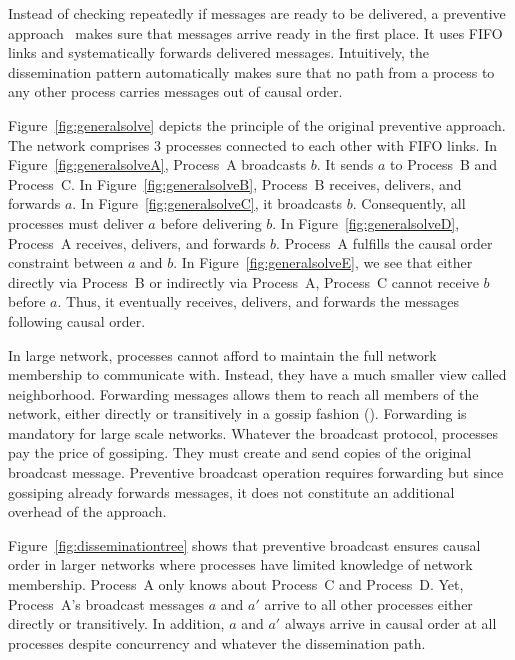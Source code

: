 Instead of checking repeatedly if messages are ready to be delivered, a
preventive approach~\cite{friedman2004causal} makes sure that messages arrive
ready in the first place.  It uses FIFO links and systematically forwards
delivered messages.  Intuitively, the dissemination pattern automatically makes
sure that no path from a process to any other process carries messages out of
causal order.

Figure~\ref{fig:generalsolve} depicts the principle of the original preventive
approach. The network comprises 3 processes connected to each other with FIFO
links.  In Figure~\ref{fig:generalsolveA}, Process~A broadcasts $b$. It sends
$a$ to Process~B and Process~C. In Figure~\ref{fig:generalsolveB}, Process~B
receives, delivers, and forwards $a$. In Figure~\ref{fig:generalsolveC}, it
broadcasts $b$. Consequently, all processes must deliver $a$ before delivering
$b$. In Figure~\ref{fig:generalsolveD}, Process~A receives, delivers, and
forwards $b$. Process~A fulfills the causal order constraint between $a$ and
$b$. In Figure~\ref{fig:generalsolveE}, we see that either directly via
Process~B or indirectly via Process~A, Process~C cannot receive $b$ before
$a$. Thus, it eventually receives, delivers, and forwards the messages following
causal order.


In large network, processes cannot afford to maintain the full network
membership to communicate with. Instead, they have a much smaller view called
neighborhood. Forwarding messages allows them to reach all members of the
network, either directly or transitively in a gossip fashion (\REF). Forwarding
is mandatory for large scale networks.  Whatever the broadcast protocol,
processes pay the price of gossiping. They must create and send copies of the
original broadcast message. Preventive broadcast operation requires forwarding
but since gossiping already forwards messages, it does not constitute an
additional overhead of the approach.

Figure~\ref{fig:disseminationtree} shows that preventive broadcast ensures
causal order in larger networks where processes have limited knowledge of
network membership.  Process~A only knows about Process~C and Process~D.  Yet,
Process~A's broadcast messages $a$ and $a'$ arrive to all other processes either
directly or transitively. In addition, $a$ and $a'$ always arrive in causal
order at all processes despite concurrency and whatever the dissemination path.

